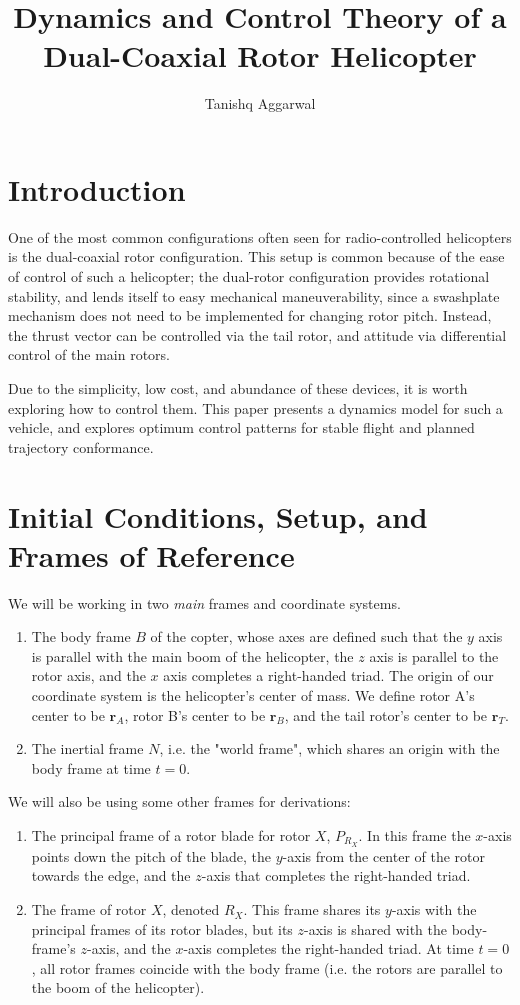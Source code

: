 \documentclass[10pt,letterpaper,final]{article}
\author{Tanishq Aggarwal}
\title{Dynamics and Control Theory of a Dual-Coaxial Rotor Helicopter}
\date{}
\begin{document}
\maketitle
\section{Introduction}
One of the most common configurations often seen for radio-controlled helicopters is the dual-coaxial rotor configuration. This setup is common because of the ease of control of such a helicopter; the dual-rotor configuration provides rotational stability, and lends itself to easy mechanical maneuverability, since a swashplate mechanism does not need to be implemented for changing rotor pitch. Instead, the thrust vector can be controlled via the tail rotor, and attitude via differential control of the main rotors.

Due to the simplicity, low cost, and abundance of these devices, it is worth exploring how to control them. This paper presents a dynamics model for such a vehicle, and explores optimum control patterns for stable flight and planned trajectory conformance.

\section{Initial Conditions, Setup, and Frames of Reference}
We will be working in two \textit{main} frames and coordinate systems. 
\begin{enumerate}
\item The body frame $B$ of the copter, whose axes are defined such that the $y$ axis is parallel with the main boom of the helicopter, the $z$ axis is parallel to the rotor axis, and the $x$ axis completes a right-handed triad. The origin of our coordinate system is the helicopter's center of mass. We define rotor A's center to be $\bm{r}_A$, rotor B's center to be $\bm{r}_B$, and the tail rotor's center to be $\bm{r}_T$. 
\item The inertial frame $N$, i.e. the "world frame", which shares an origin with the body frame at time $t = 0$. 
\end{enumerate}
We will also be using some other frames for derivations:
\begin{enumerate}
\item The principal frame of a rotor blade for rotor $X$, $P_{R_X}$. In this frame the $x$-axis points down the pitch of the blade, the $y$-axis from the center of the rotor towards the edge, and the $z$-axis that completes the right-handed triad.
\item The frame of rotor $X$, denoted $R_X$. This frame shares its $y$-axis with the principal frames of its rotor blades, but its $z$-axis is shared with the body-frame's $z$-axis, and the $x$-axis completes the right-handed triad. At time $t = 0$, all rotor frames coincide with the body frame (i.e. the rotors are parallel to the boom of the helicopter).
\end{enumerate}
\end{document}
